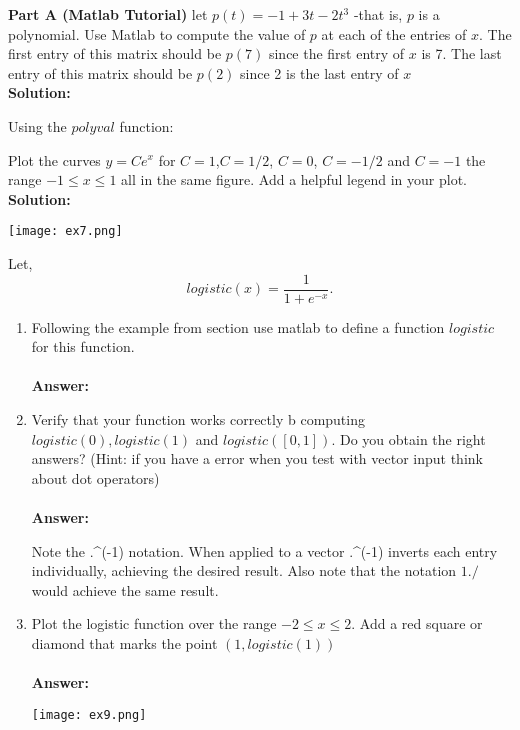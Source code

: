 \documentclass[12pt]{article}
\makeatletter
\theoremstyle{homework}
\newenvironment{exercise}[1]
{\def\@currentlabel{#1}\exercisecore}
{\endexercisecore}
\makeatother
\begin{document}
\textbf{Part A (Matlab Tutorial)}
\begin{exercise}{5}
let $p(t) = -1+3t-2t^3$ -that is, $p$ is a polynomial. Use Matlab to compute the value of $p$
at each of the entries of $x$. The first entry of this matrix should be $p(7)$ since the first entry of $x$ is 7. 
The last entry of this matrix should be $p(2)$ since 2 is the last entry of $x$ \\

\textbf{Solution:}

Using the $polyval$ function:

\end{exercise}

\vspace{1in}



\begin{exercise}{7} Plot the curves $y = Ce^x$ for $C = 1$,$C = 1/2$, $C = 0$, $C = -1/2$ and $C = -1$ 
  the range $-1 \leq x \leq 1$ all in the same figure. Add a helpful legend in your plot.\\

  \textbf{Solution:}
  
  \texttt{[image: ex7.png]}

  
\end{exercise}

\vspace{1in}


\begin{exercise}{9} Let,
  \begin{equation*}
    logistic(x) = \frac{1}{1+e^{-x}}.
  \end{equation*}

  \begin{enumerate}
    \item Following the example from section use matlab to define a function $logistic$ for this function.\\\\
    \textbf{Answer:}
    

    
    \item Verify that your function works correctly b computing $logistic(0), logistic(1)$ and $logistic([0,1])$. Do you obtain the right answers? (Hint: if you have a error when you test with vector input think about dot operators)\\\\
    \textbf{Answer:}
    
    Note the .\string^(-1) notation. When applied to a vector .\string^(-1) inverts each entry individually, achieving the desired result. Also note that the notation $1./$ would achieve the same result.

    \item Plot the logistic function over the range $-2 \leq x \leq 2$. Add a red square or diamond that marks the point $(1, logistic(1))$ \\\\
    \textbf{Answer:}
    
    \texttt{[image: ex9.png]}
  \end{enumerate}
  



\end{exercise}
\end{document}
